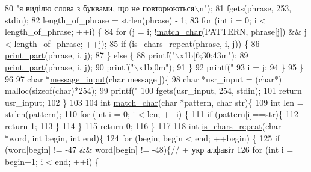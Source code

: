\begin{DoxyCodeInclude}
80            \textcolor{stringliteral}{"я виділю слова з буквами, що не повторюються\(\backslash\)n"});
81     fgets(phrase, 253, stdin);
82     length\_of\_phrase = strlen(phrase) - 1;
83     \textcolor{keywordflow}{for} (\textcolor{keywordtype}{int} i = 0; i < length\_of\_phrase; ++i) \{
84         \textcolor{keywordflow}{for} (j = i; !\hyperlink{main_8c_ab0ab11d738b0fee4c4d5a6ef5aa74cb5}{match\_char}(PATTERN, phrase[j]) && j < length\_of\_phrase; ++j);
85         \textcolor{keywordflow}{if} (\hyperlink{main_8c_a9f2357981154612b8f19cdb92afe9308}{is\_chars\_repeat}(phrase, i, j)) \{
86             \hyperlink{main_8c_aade7efb4781be6777c4015fa8610569f}{print\_part}(phrase, i, j);
87         \} \textcolor{keywordflow}{else} \{
88             printf(\textcolor{stringliteral}{"\(\backslash\)x1b[6;30;43m"});
89             \hyperlink{main_8c_aade7efb4781be6777c4015fa8610569f}{print\_part}(phrase, i, j);
90             printf(\textcolor{stringliteral}{"\(\backslash\)x1b[0m"});
91         \}
92         printf(\textcolor{stringliteral}{"%
93         i = j;
94     \}
95 \}
96 
97 \textcolor{keywordtype}{char} *\hyperlink{main_8c_a638293d509eded9d6ef7552ae1b17f2b}{message\_input}(\textcolor{keywordtype}{char} message[])\{
98     \textcolor{keywordtype}{char} *usr\_input = (\textcolor{keywordtype}{char}*) malloc(\textcolor{keyword}{sizeof}(\textcolor{keywordtype}{char})*254);
99     printf(\textcolor{stringliteral}{"%
100     fgets(usr\_input, 254, stdin);
101     \textcolor{keywordflow}{return} usr\_input;
102 \}
103 
104 \textcolor{keywordtype}{int} \hyperlink{main_8c_ab0ab11d738b0fee4c4d5a6ef5aa74cb5}{match\_char}(\textcolor{keywordtype}{char} *pattern, \textcolor{keywordtype}{char} str)\{
109     \textcolor{keywordtype}{int} len = strlen(pattern);
110     \textcolor{keywordflow}{for} (\textcolor{keywordtype}{int} i = 0; i < len; ++i) \{
111         \textcolor{keywordflow}{if} (pattern[i]==str)\{
112             \textcolor{keywordflow}{return} 1;
113         \}
114     \}
115     \textcolor{keywordflow}{return} 0;
116 \}
117 
118 \textcolor{keywordtype}{int} \hyperlink{main_8c_a9f2357981154612b8f19cdb92afe9308}{is\_chars\_repeat}(\textcolor{keywordtype}{char} *word, \textcolor{keywordtype}{int} begin, \textcolor{keywordtype}{int} end)\{
124     \textcolor{keywordflow}{for} (begin; begin < end; ++begin) \{
125         \textcolor{keywordflow}{if} (word[begin] != -47 && word[begin] != -48)\{\textcolor{comment}{// + укр алфавіт}
126             \textcolor{keywordflow}{for} (\textcolor{keywordtype}{int} i = begin+1; i < end; ++i) \{
}}
\end{DoxyCodeInclude}
